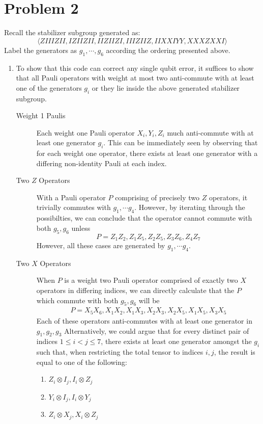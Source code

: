 \documentclass[12pt]{article}%
\begin{document}
\section*{Problem 2}
Recall the stabilizer subgroup generated as: \[ \langle ZIIIZII, IZIIZII, IIZIIZI, IIIZIIZ, IIXXIYY, XXXZXXI \rangle \]
Label the generators as $g_1, \cdots, g_6$ according the ordering presented above.
\begin{enumerate}
	\item To show that this code can correct any single qubit error, it suffices to show that all Pauli operators with weight at most two anti-commute with at least one of the generators $g_i$ or they lie inside the above generated stabilizer subgroup. 
		\begin{description}
			\item[Weight 1 Paulis] Each weight one Pauli operator $X_i, Y_i, Z_i$ much anti-commute with at least one generator $g_i$. This can be immediately seen by observing that for each weight one operator, there exists at least one generator with a differing non-identity Pauli at each index.
			\item[Two $Z$ Operators] With a Pauli operator $P$ comprising of precisely two $Z$ operators, it trivially commutes with $g_1, \cdots g_4$. However, by iterating through the possibilties, we can conclude that the operator cannot commute with both $g_5,g_6$ unless \[ P=Z_1Z_2, Z_1Z_5, Z_2Z_5, Z_3Z_6, Z_4Z_7 \]
				However, all these cases are generated by $g_1, \cdots g_4$.
			\item[Two $X$ Operators] When $P$ is a weight two Pauli operator comprised of exactly two $X$ operators in differing indices, we can directly calculate that the $P$ which commute with both $g_5, g_6$ will be 
				\begin{align*}
					P = X_5X_6, X_1X_2, X_1X_3, X_2X_3, X_2X_5, X_1X_5, X_3X_5
				\end{align*}
				Each of these operators anti-commutes with at least one generator in $g_1, g_2, g_3$
				Alternatively, we could argue that for every distinct pair of indices $1 \leq i < j \leq 7$, there exists at least one generator amongst the $g_i$ such that, when restricting the total tensor to indices $i,j$, the result is equal to one of the following:
		\begin{enumerate}
			\item \(Z_i \otimes I_j, I_i \otimes Z_j\) 
			\item  \(Y_i \otimes I_j, I_i \otimes Y_j\) 
			\item \(Z_i \otimes X_j, X_i \otimes Z_j\) 

\end{enumerate}
\end{description}
\end{enumerate}
\end{document}
